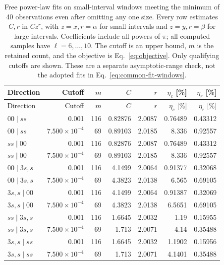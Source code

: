 \begin{longtable}{lrrrrrr}
\caption{Free power-law fits on small-interval windows meeting the minimum of 40 observations even after omitting any one size. Every row estimates $C,r$ in $Cz^r$, with $z=x,r=\alpha$ for small intervals and $z=y,r=\beta$ for large intervals. Coefficients include all powers of $\pi$; all computed samples have $\ell=6,\ldots,10$. The cutoff is an upper bound, $m$ is the retained count, and the objective is Eq.~\eqref{eq:objective}. Only qualifying cutoffs are shown. These are a separate asymptotic-range check, not the adopted fits in Eq.~\eqref{eq:common-fit-windows}.}
\label{tab:boson-small-windows}\\\toprule
Direction & Cutoff & $m$ & $C$ & $r$ & $\eta_c$ [\%] & $\eta_r$ [\%]\\\midrule
\endfirsthead
\toprule
Direction & Cutoff & $m$ & $C$ & $r$ & $\eta_c$ [\%] & $\eta_r$ [\%]\\\midrule
\endhead
\bottomrule\endfoot
$00\mid ss$ & 0.001 & 116 & 0.82876 & 2.0087 & 0.76489 & 0.43312\\
$00\mid ss$ & $7.500\!\times\!10^{-4}$ & 69 & 0.89103 & 2.0185 & 8.336 & 0.92557\\
$ss\mid 00$ & 0.001 & 116 & 0.82876 & 2.0087 & 0.76489 & 0.43312\\
$ss\mid 00$ & $7.500\!\times\!10^{-4}$ & 69 & 0.89103 & 2.0185 & 8.336 & 0.92557\\
$00\mid 3s,s$ & 0.001 & 116 & 4.1499 & 2.0064 & 0.91377 & 0.32068\\
$00\mid 3s,s$ & $7.500\!\times\!10^{-4}$ & 69 & 4.3823 & 2.0138 & 6.565 & 0.69105\\
$3s,s\mid 00$ & 0.001 & 116 & 4.1499 & 2.0064 & 0.91387 & 0.32069\\
$3s,s\mid 00$ & $7.500\!\times\!10^{-4}$ & 69 & 4.3823 & 2.0138 & 6.5651 & 0.69105\\
$ss\mid 3s,s$ & 0.001 & 116 & 1.6645 & 2.0032 & 1.19 & 0.15955\\
$ss\mid 3s,s$ & $7.500\!\times\!10^{-4}$ & 69 & 1.713 & 2.0071 & 4.14 & 0.35488\\
$3s,s\mid ss$ & 0.001 & 116 & 1.6645 & 2.0032 & 1.1902 & 0.15956\\
$3s,s\mid ss$ & $7.500\!\times\!10^{-4}$ & 69 & 1.713 & 2.0071 & 4.1401 & 0.35488\\
\end{longtable}
